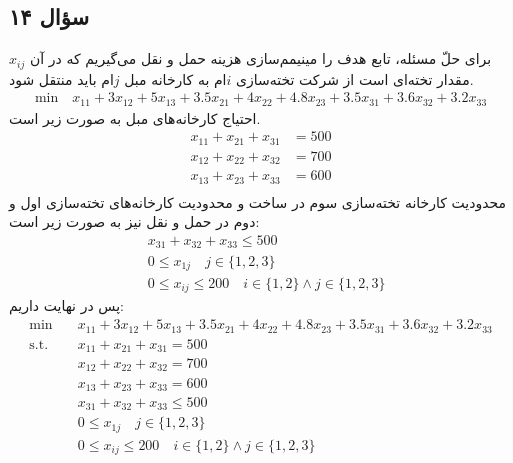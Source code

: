 \subsection*{سؤال ۱۴}
برای حلّ مسئله، تابع هدف را مینیمم‌سازی هزینه حمل و نقل می‌گیریم که در آن $x_{ij}$ مقدار تخته‌ای است از شرکت تخته‌سازی $i$ام به کارخانه مبل $j$ام باید منتقل شود.
\begin{align*}
  \text{min} \quad
  x_{11} + 3x_{12} + 5x_{13} +
  3.5x_{21} + 4x_{22} + 4.8x_{23} +
  3.5x_{31} + 3.6x_{32} + 3.2x_{33}
\end{align*}
احتیاج کارخانه‌های مبل به صورت زیر است.
\begin{align*}
  x_{11} + x_{21} + x_{31} &= 500 \\
  x_{12} + x_{22} + x_{32} &= 700 \\
  x_{13} + x_{23} + x_{33} &= 600 \\
\end{align*}
محدودیت کارخانه تخته‌سازی سوم در ساخت و محدودیت کارخانه‌های تخته‌سازی اول و دوم در حمل و نقل نیز به صورت زیر است:
\begin{align*}
  &x_{31} + x_{32} + x_{33} \leq 500 \\
  &0 \leq x_{1j} \quad j \in \{1, 2, 3\} \\
  &0 \leq x_{ij} \leq 200 \quad
  i \in \{1, 2\} \land j \in \{1, 2, 3\}
\end{align*}
پس در نهایت داریم:
\begin{align*}
  \text{min} \quad
  &x_{11} + 3x_{12} + 5x_{13} +
  3.5x_{21} + 4x_{22} + 4.8x_{23} +
  3.5x_{31} + 3.6x_{32} + 3.2x_{33} \\
  \text{s.t.} \quad
  &x_{11} + x_{21} + x_{31} = 500 \\
  &x_{12} + x_{22} + x_{32} = 700 \\
  &x_{13} + x_{23} + x_{33} = 600 \\
  &x_{31} + x_{32} + x_{33} \leq 500 \\
  &0 \leq x_{1j} \quad j \in \{1, 2, 3\} \\
  &0 \leq x_{ij} \leq 200 \quad
  i \in \{1, 2\} \land j \in \{1, 2, 3\}
\end{align*}

